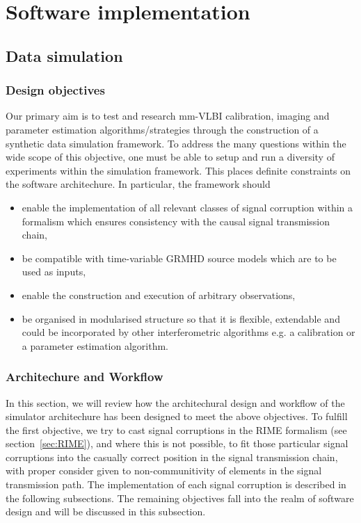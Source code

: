 \chapter{Software implementation}

\section{Data simulation}\label{sec:sim}
\subsection{Design objectives}
Our primary aim is to test and research mm-VLBI calibration, imaging and parameter estimation algorithms/strategies through the construction of a synthetic data simulation framework. To address the many questions within the wide scope of this objective, one must be able to setup and run a diversity of experiments within the simulation framework. This places definite constraints on the software architechure. In particular, the framework should 

\begin{itemize}
 \item enable the implementation of all relevant classes of signal corruption within a formalism which ensures consistency with the causal signal transmission chain,
 \item be compatible with time-variable GRMHD source models which are to be used as inputs,
 \item enable the construction and execution of arbitrary observations,
 
 \item be organised in modularised structure so that it is flexible, extendable and could be incorporated by other interferometric algorithms e.g. a calibration or a parameter estimation algorithm.
\end{itemize}

\subsection{Architechure and Workflow}
In this section, we will review how the architechural design and workflow of the simulator architechure has been designed to meet the above objectives. To fulfill the first objective, we try to cast signal corruptions in the RIME formalism (see section~\ref{sec:RIME}), and where this is not possible, to fit those particular signal corruptions into the casually correct position in the signal transmission chain, with proper consider given to non-communitivity of elements in the signal transmission path. The implementation of each signal corruption is described in the following subsections. The remaining objectives fall into the realm of software design and will be discussed in this subsection.


